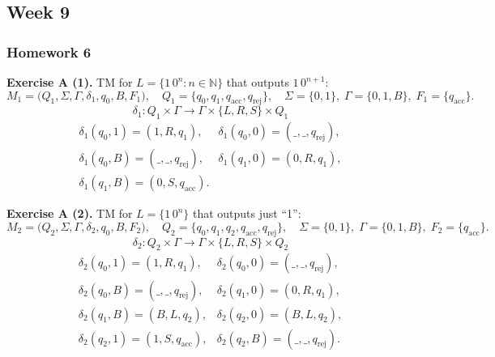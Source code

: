 \documentclass{article}
\theoremstyle{theorem}
\theoremstyle{definition}
\theoremstyle{remark}
\begin{document}
\subsection{Week 9}




\subsubsection*{Homework 6}

\noindent\textbf{Exercise A (1).} TM for \(L=\{1\,0^n : n\in\mathbb{N}\}\) that outputs \(1\,0^{n+1}\):
\[
M_1 = \bigl(Q_1,\Sigma,\Gamma,\delta_1,q_0,B,F_1\bigr),
\quad
Q_1=\{q_0,q_1,q_{\mathrm{acc}},q_{\mathrm{rej}}\},
\quad
\Sigma=\{0,1\},\;\Gamma=\{0,1,B\},\;
F_1=\{q_{\mathrm{acc}}\}.
\]
\[
\delta_1\colon Q_1\times\Gamma\to\Gamma\times\{L,R,S\}\times Q_1
\]
\[
\begin{array}{rl}
\delta_1(q_0,1)=(1,R,q_1), & \delta_1(q_0,0)=(\_,\_,q_{\mathrm{rej}}),\\
\delta_1(q_0,B)=(\_,\_,q_{\mathrm{rej}}), &
\delta_1(q_1,0)=(0,R,q_1),\\
\delta_1(q_1,B)=(0,S,q_{\mathrm{acc}}).
\end{array}
\]

\medskip
\noindent\textbf{Exercise A (2).} TM for \(L=\{1\,0^n\}\) that outputs just “1”:
\[
M_2 = \bigl(Q_2,\Sigma,\Gamma,\delta_2,q_0,B,F_2\bigr),
\quad
Q_2=\{q_0,q_1,q_2,q_{\mathrm{acc}},q_{\mathrm{rej}}\},
\quad
\Sigma=\{0,1\},\;\Gamma=\{0,1,B\},\;
F_2=\{q_{\mathrm{acc}}\}.
\]
\[
\delta_2\colon Q_2\times\Gamma\to\Gamma\times\{L,R,S\}\times Q_2
\]
\[
\begin{array}{rl}
\delta_2(q_0,1)=(1,R,q_1), & \delta_2(q_0,0)=(\_,\_,q_{\mathrm{rej}}),\\
\delta_2(q_0,B)=(\_,\_,q_{\mathrm{rej}}), &
\delta_2(q_1,0)=(0,R,q_1),\\
\delta_2(q_1,B)=(B,L,q_2), &
\delta_2(q_2,0)=(B,L,q_2),\\
\delta_2(q_2,1)=(1,S,q_{\mathrm{acc}}), &
\delta_2(q_2,B)=(\_,\_,q_{\mathrm{rej}}).
\end{array}
\]
\end{document}
